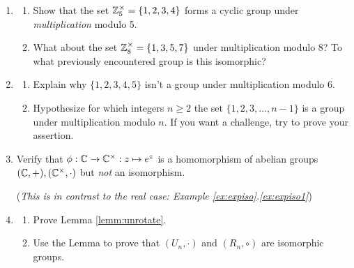 \begin{exercises}
\begin{enumerate}
  \item\begin{enumerate}
    \item\label{exs:z5times} Show that the set $\mathbb{Z}_5^\times=\{1,2,3,4\}$ forms a cyclic group under \emph{multiplication} modulo 5.
    \item What about the set $\mathbb{Z}_8^\times=\{1,3,5,7\}$ under multiplication modulo 8? To what previously encountered group is this isomorphic?
  \end{enumerate}
    
  \item\begin{enumerate}
  	\item Explain why $\{1,2,3,4,5\}$ isn't a group under multiplication modulo 6.
   	\item Hypothesize for which integers $n\ge 2$ the set $\{1,2,3,\ldots,n-1\}$ is a group under multiplication modulo $n$. If you want a challenge, try to prove your assertion.
  \end{enumerate}
	


  
   	\item Verify that $\phi:\mathbb{C}\to\mathbb{C}^\times:z\mapsto e^z$ is a homomorphism of abelian groups $(\mathbb{C},+),(\mathbb{C}^\times,\cdot)$ but \emph{not} an isomorphism.\par
   	(\emph{This is in contrast to the real case: Example \ref*{ex:expiso}.\ref{ex:expiso1}})



	\item\begin{enumerate}
	  \item Prove Lemma \ref{lemm:unrotate}.
	  \item Use the Lemma to prove that $(U_n,\cdot)$ and $(R_n,\circ)$ are isomorphic groups.
	\end{enumerate}
 
\end{enumerate}
\end{exercises}

